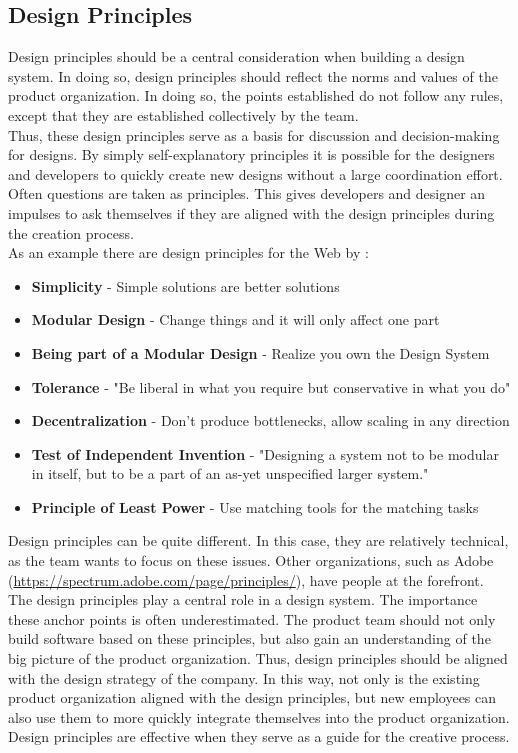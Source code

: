 \subsection{Design Principles}
Design principles should be a central consideration when building a design system. In doing so, design principles should reflect the norms and values of the product organization.  In doing so, the points established do not follow any rules, except that they are established collectively by the team.  \\
Thus, these design principles serve as a basis for discussion and decision-making for designs. By simply self-explanatory principles it is possible for the designers and developers to quickly create new designs without a large coordination effort. Often questions are taken as principles. This gives developers and designer an impulses to ask themselves if they are aligned with the design principles during the creation process. \cite{brignell_design_2022} \\
As an example there are design principles for the Web by \citet{berners-lee_principles_2013}: 
\begin{itemize}
\item \textbf{Simplicity} - Simple solutions are better solutions
\item \textbf{Modular Design} - Change things and it will only affect one part
\item \textbf{Being part of a Modular Design} - Realize you own the Design System
\item \textbf{Tolerance} - "Be liberal in what you require but conservative in what you do"
\item \textbf{Decentralization} - Don't produce bottlenecks, allow scaling in any direction
\item \textbf{Test of Independent Invention} - "Designing a system not to be modular in itself, but to be a part of an as-yet unspecified larger system."
\item \textbf{Principle of Least Power} - Use matching tools for the matching tasks
\end{itemize}
Design principles can be quite different. In this case, they are relatively technical, as the team wants to focus on these issues. Other organizations, such as Adobe (\url{https://spectrum.adobe.com/page/principles/}), have people at the forefront.  \\
The design principles play a central role in a design system. The importance these anchor points is often underestimated. The product team should not only build software based on these principles, but also gain an understanding of the big picture of the product organization. Thus, design principles should be aligned with the design strategy of the company.  In this way, not only is the existing product organization aligned with the design principles, but new employees can also use them to more quickly integrate themselves into the product organization.  Design principles are effective when they serve as a guide for the creative process.\cite{vesselov_building_2019} \\
